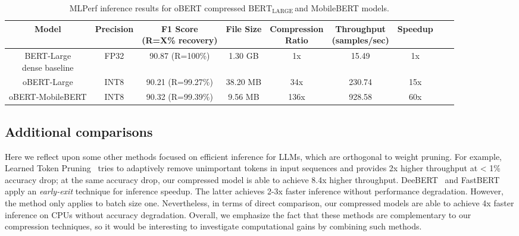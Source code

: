 \documentclass[11pt]{article}
\newcommand{\bertL}{$\textrm{BERT}_{\textrm{LARGE}}\,$}
\begin{document}
\begin{table}[ht!]
    \caption{MLPerf inference results for oBERT compressed \bertL and MobileBERT models.}
    \label{tab:mlperf}
    \centering
    {\small
    \begin{tabular}{ccccccccc}
    \toprule 
    Model & Precision & \makecell{F1 Score\\(R=X\% recovery)} & File Size & \makecell{Compression\\Ratio} & \makecell{Throughput\\(samples/sec)} & Speedup \\
    \midrule
    \makecell{BERT-Large\\dense baseline} & FP32 & 90.87 (R=100\%) & 1.30 GB & 1x & 15.49 & 1x \\
    \midrule
    oBERT-Large & INT8 & 90.21 (R=99.27\%) & 38.20 MB & \phantom{1}34x & 230.74 & 15x \\
    oBERT-MobileBERT & INT8 & 90.32 (R=99.39\%) & \phantom{1}9.56 MB & 136x & 928.58 & 60x \\
    \bottomrule
    \end{tabular}
    }
\end{table}

\subsection{Additional comparisons}
\label{app:additional_comparisons}
Here we reflect upon some other methods focused on efficient inference for LLMs, which are orthogonal to weight pruning. For example, Learned Token Pruning~\cite{kim2021learned} tries to adaptively remove unimportant tokens in input sequences and provides 2x higher throughput at < 1\% accuracy drop; at the same accuracy drop, our compressed model is able to achieve 8.4x higher throughput. DeeBERT~\cite{Xin2020DeeBERTDE} and FastBERT~\cite{liu2020fastbert} apply an \emph{early-exit} technique for inference speedup. The latter achieves 2-3x faster inference without performance degradation. However, the method only applies to batch size one. Nevertheless, in terms of direct comparison, our compressed models are able to achieve 4x faster inference on CPUs without accuracy degradation. 
Overall, we emphasize the fact that these methods are complementary to our compression techniques, so it would be interesting to investigate computational gains by combining such methods.
\end{document}
